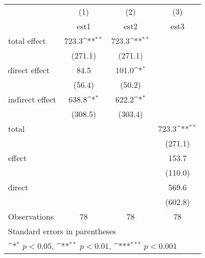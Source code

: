 {
\def\sym#1{\ifmmode^{#1}\else\(^{#1}\)\fi}
\begin{tabular}{l*{3}{c}}
\hline\hline
                &\multicolumn{1}{c}{(1)}         &\multicolumn{1}{c}{(2)}         &\multicolumn{1}{c}{(3)}         \\
                &     est1         &     est2         &     est3         \\
\hline
total effect            &    723.3\sym{**} &    723.3\sym{**} &                  \\
                &  (271.1)         &  (271.1)         &                  \\
direct effect           &     84.5         &    101.0\sym{*}  &                  \\
                &   (56.4)         &   (50.2)         &                  \\
indirect effect         &    638.8\sym{*}  &    622.2\sym{*}  &                  \\
                &  (308.5)         &  (303.4)         &                  \\
total           &                  &                  &    723.3\sym{**} \\
                &                  &                  &  (271.1)         \\
effect          &                  &                  &    153.7         \\
                &                  &                  &  (110.0)         \\
direct          &                  &                  &    569.6         \\
                &                  &                  &  (602.8)         \\
\hline
Observations    &       78         &       78         &       78         \\
\hline\hline
\multicolumn{4}{l}{\footnotesize Standard errors in parentheses}\\
\multicolumn{4}{l}{\footnotesize \sym{*} \(p<0.05\), \sym{**} \(p<0.01\), \sym{***} \(p<0.001\)}\\
\end{tabular}
}
